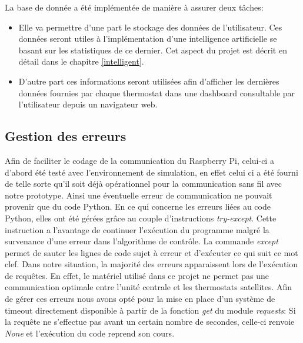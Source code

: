 \documentclass[12pt]{report}
\begin{document}
\noindent
La base de donnée a été implémentée de manière à assurer deux tâches:\\
\begin{itemize}
\item Elle va permettre d'une part le stockage des données de l'utilisateur. Ces données seront utiles à l'implémentation d'une intelligence artificielle se basant sur les statistiques de ce dernier. Cet aspect du projet est décrit en détail dans le chapitre \ref{intelligent}.\\ %
\item D'autre part ces informations seront utilisées afin d'afficher les dernières données fournies par chaque thermostat dans une dashboard consultable par l'utilisateur depuis un navigateur web.
\end{itemize}


\subsection{Gestion des erreurs}
Afin de faciliter le codage de la communication du Raspberry Pi, celui-ci a d'abord été testé avec l'environnement de simulation, en effet celui ci a été fourni de telle sorte qu'il soit déjà opérationnel pour la communication sans fil avec notre prototype. Ainsi une éventuelle erreur de communication ne pouvait provenir que du code Python. En ce qui concerne les erreurs liées au code Python, elles ont été gérées grâce au couple d'instructions \emph{try-except}. Cette instruction a l'avantage de continuer l'exécution du programme malgré la survenance d'une erreur dans l'algorithme de contrôle. La commande \emph{except} permet de sauter les lignes de code sujet à erreur et d'exécuter ce qui suit ce mot clef. Dans notre situation, la majorité des erreurs apparaissent lors de l'exécution de requêtes. En effet, le matériel utilisé dans ce projet ne permet pas une communication optimale entre l'unité centrale et les thermostats satellites. Afin de gérer ces erreurs nous avons opté pour la mise en place d'un système de timeout directement disponible à partir de la fonction \emph{get} du module \emph{requests}: Si la requête ne s'effectue pas avant un certain nombre de secondes, celle-ci renvoie \emph{None} et l'exécution du code reprend son cours.
\end{document}
